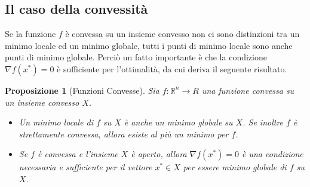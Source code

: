 \documentclass[a4paper, 12pt]{article}
\newtheorem{prop}{Proposizione}
\begin{document}
\subsection{Il caso della convessità}
Se la funzione $f$ è convessa su un insieme convesso non ci sono distinzioni tra un minimo locale ed un minimo globale, tutti i punti di minimo locale sono anche punti di minimo globale. Perciò un fatto importante è che la condizione $\nabla f(x^\ast) = 0$ è sufficiente per l'ottimalità, da cui deriva il seguente risultato.
\begin{prop}[Funzioni Convesse] Sia $f:\mathbb{R}^n \to R$ una funzione convessa su un insieme convesso $X$.
\begin{itemize}
  \item Un minimo locale di $f$ su $X$ è anche un minimo globale su $X$. Se inoltre $f$ è strettamente convessa, allora esiste al più un minimo per $f$.
  \item Se $f$ è convessa e l'insieme $X$ è aperto, allora $\nabla f(x^\ast) = 0$ è una condizione necessaria e sufficiente per il vettore $x^\ast \in X$ per essere minimo globale di $f$ su $X$.
\end{itemize}
\end{prop}
\end{document}
